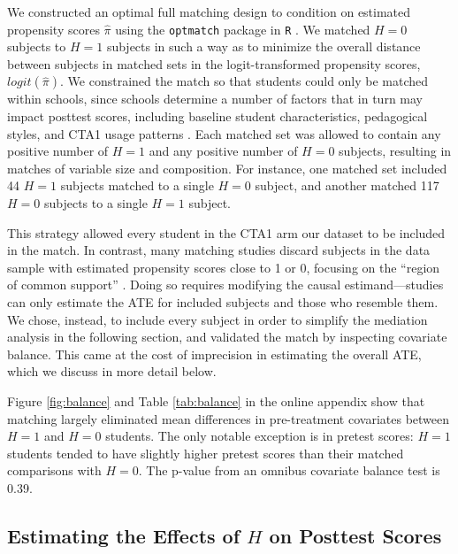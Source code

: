 \documentclass{article}\usepackage[]{graphicx}\usepackage[]{color}
\begin{document}
We constructed an optimal full matching design \citep{hansen2004} to
condition on estimated propensity scores $\hat{\pi}$ using the
\texttt{optmatch} package in \texttt{R} \citep{optmatch}.
We matched $H=0$ subjects to $H=1$ subjects in such a way as
to minimize the overall distance between subjects in matched sets in
the logit-transformed propensity scores, $logit(\hat{\pi})$.
We constrained the match so that students could only be matched within
schools, since schools determine a number of factors
that in turn may impact posttest scores, including baseline
student characteristics, pedagogical styles, and CTA1 usage patterns
\citep[see][]{descriptivePaper}.%
Each matched set was allowed to contain any positive number of $H=1$
and any positive number of $H=0$ subjects, resulting in matches of
variable size and composition.
For instance, one matched set included 44 $H=1$ subjects matched to a
single $H=0$ subject, and another matched 117 $H=0$ subjects to a
single $H=1$ subject.

This strategy allowed every student in the CTA1 arm our dataset to be included in the match.
In contrast, many matching studies discard subjects in the data sample
with estimated propensity scores close to 1 or 0, focusing on the
``region of common support'' \citep[e.g.]{caliendo2008some,shadish2010primer}.
Doing so requires modifying the causal estimand---studies can only
estimate the ATE for included subjects and those who resemble them.
We chose, instead, to include every subject in order to simplify the mediation
analysis in the following section, and validated the match by
inspecting covariate balance.
This came at the cost of imprecision in estimating the overall ATE,
which we discuss in more detail below.

Figure \ref{fig:balance} and Table \ref{tab:balance} in the online appendix show that
matching largely eliminated mean differences in pre-treatment
covariates between $H=1$ and $H=0$ students.
The only notable exception is in pretest scores: $H=1$ students tended
to have slightly higher pretest scores than their matched comparisons
with $H=0$.
The p-value from an omnibus covariate balance test
\citep{covBal} is 0.39.

\subsection{Estimating the Effects of $H$ on Posttest Scores}\label{sec:obsEst}
\end{document}

